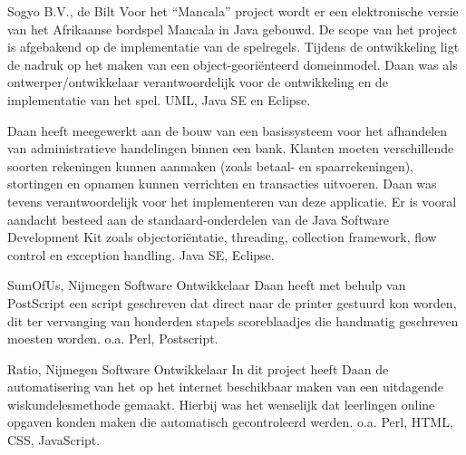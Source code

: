 \begin{workExperience}{Sogyo B.V., de Bilt}
		Voor het ``Mancala'' project wordt er een elektronische versie van het
		Afrikaanse bordspel Mancala in Java gebouwd. De scope van het
		project is afgebakend op de implementatie van de spelregels. Tijdens
		de ontwikkeling ligt de nadruk op het maken van een
		object-geori\"enteerd domeinmodel. Daan was als ontwerper/ontwikkelaar
		verantwoordelijk voor de ontwikkeling en de implementatie van het
		spel.
		\technics UML, Java SE en Eclipse.

		Daan heeft meegewerkt aan de bouw van een basissysteem voor het
		afhandelen van administratieve handelingen binnen een bank. Klanten
		moeten verschillende soorten rekeningen kunnen aanmaken (zoals betaal-
		en spaarrekeningen), stortingen en opnamen kunnen verrichten en
		transacties uitvoeren. Daan was tevens verantwoordelijk voor het
		implementeren van deze applicatie.
		Er is vooral aandacht besteed aan de standaard-onderdelen van de Java
		Software Development Kit zoals objectori\"entatie, threading, collection
		framework, flow control en exception handling.
		\technics Java SE, Eclipse.
	\end{workExperience}

	\begin{workExperience}{SumOfUs, Nijmegen}%
	{Software Ontwikkelaar}%
	{}
		Daan heeft met behulp van PostScript een script geschreven dat direct
		naar de printer gestuurd kon worden, dit ter vervanging van honderden
		stapels scoreblaadjes die handmatig geschreven moesten worden.
		\technics o.a. Perl, Postscript.
	\end{workExperience}

	\begin{workExperience}{Ratio, Nijmegen}%
	{Software Ontwikkelaar}%
	{}
		In dit project heeft Daan de automatisering van het op het internet
		beschikbaar maken van een uitdagende wiskundelesmethode gemaakt. Hierbij
		was het wenselijk dat leerlingen online opgaven konden maken die
		automatisch gecontroleerd werden.
		\technics o.a. Perl, HTML, CSS, JavaScript.
	\end{workExperience}

